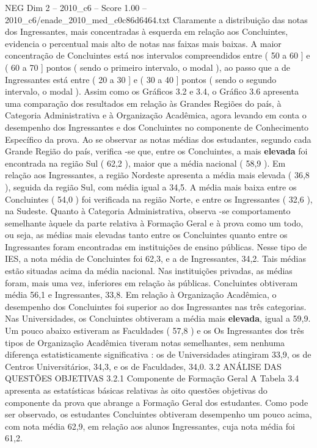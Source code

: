 \begin{textsample}{NEG Dim 2 – 2010\_c6 – Score 1.00 – 2010\_c6/enade\_2010\_med\_c0c86d6464.txt}
Claramente a distribuição das notas dos Ingressantes, mais concentradas à esquerda em relação aos Concluintes, evidencia o percentual mais alto de notas nas faixas mais baixas.
A maior concentração de Concluintes está nos intervalos compreendidos entre ( 50 a 60 ] e ( 60 a 70 ] pontos ( sendo o primeiro intervalo, o modal ), ao passo que a de Ingressantes está entre ( 20 a 30 ] e ( 30 a 40 ] pontos ( sendo o segundo intervalo, o modal ).
Assim como os Gráficos 3.2 e 3.4, o Gráfico 3.6 apresenta uma comparação dos resultados em relação às Grandes Regiões do país, à Categoria Administrativa e à Organização Acadêmica, agora levando em conta o desempenho dos Ingressantes e dos Concluintes no componente de Conhecimento Específico da prova.
Ao se observar as notas médias dos estudantes, segundo cada Grande Região do país, verifica -se que, entre os Concluintes, a mais \textbf{elevada} foi encontrada na região Sul ( 62,2 ), maior que a média nacional ( 58,9 ).
Em relação aos Ingressantes, a região Nordeste apresenta a média mais elevada ( 36,8 ), seguida da região Sul, com média igual a 34,5.
A média mais baixa entre os Concluintes ( 54,0 ) foi verificada na região Norte, e entre os Ingressantes ( 32,6 ), na Sudeste.
Quanto à Categoria Administrativa, observa -se comportamento semelhante àquele da parte relativa à Formação Geral e à prova como um todo, ou seja, as médias mais elevadas tanto entre os Concluintes quanto entre os Ingressantes foram encontradas em instituições de ensino públicas.
Nesse tipo de IES, a nota média de Concluintes foi 62,3, e a de Ingressantes, 34,2.
Tais médias estão situadas acima da média nacional.
Nas instituições privadas, as médias foram, mais uma vez, inferiores em relação às públicas.
Concluintes obtiveram média 56,1 e Ingressantes, 33,8.
Em relação à Organização Acadêmica, o desempenho dos Concluintes foi superior ao dos Ingressantes nas três categorias.
Nas Universidades, os Concluintes obtiveram a média mais \textbf{elevada}, igual a 59,9.
Um pouco abaixo estiveram as Faculdades ( 57,8 ) e os Os Ingressantes dos três tipos de Organização Acadêmica tiveram notas semelhantes, sem nenhuma diferença estatisticamente significativa : os de Universidades atingiram 33,9, os de Centros Universitários, 34,3, e os de Faculdades, 34,0. 3.2 ANÁLISE DAS QUESTÕES OBJETIVAS 3.2.1 Componente de Formação Geral A Tabela 3.4 apresenta as estatísticas básicas relativas às oito questões objetivas do componente da prova que abrange a Formação Geral dos estudantes.
Como pode ser observado, os estudantes Concluintes obtiveram desempenho um pouco acima, com nota média 62,9, em relação aos alunos Ingressantes, cuja nota média foi 61,2.

\end{textsample}
